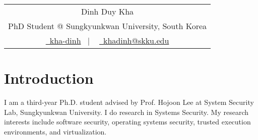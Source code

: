 \documentclass[a4paper,12pt]{article}
\begin{document}
\pagestyle{empty}



\begin{tabularx}{\linewidth}{@{} C @{}}
	\Huge{Dinh Duy Kha}                                \\[7.5pt]
	PhD Student @ Sungkyunkwan University, South Korea \\
	\href{https://github.com/kha-dinh}{\raisebox{-0.05\height}\faGithub\ kha-dinh} \ $|$ \
	\href{mailto:email@mysite.com}{\raisebox{-0.05\height}\faEnvelope \ khadinh@skku.edu}
\end{tabularx}



\section{Introduction}
I am a third-year Ph.D. student advised by Prof. Hojoon Lee at System Security Lab, Sungkyunkwan University. I do research in Systems Security. My research interests include software security, operating systems security, trusted execution environments, and virtualization.

\end{document}
